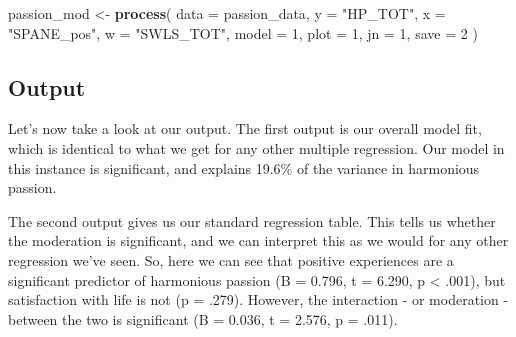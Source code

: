 \documentclass[
]{book}
\newenvironment{Shaded}{\begin{snugshade}}{\end{snugshade}}
\newcommand{\AttributeTok}[1]{\textcolor[rgb]{0.13,0.29,0.53}{#1}}
\newcommand{\DecValTok}[1]{\textcolor[rgb]{0.00,0.00,0.81}{#1}}
\newcommand{\FunctionTok}[1]{\textcolor[rgb]{0.13,0.29,0.53}{\textbf{#1}}}
\newcommand{\NormalTok}[1]{#1}
\newcommand{\OtherTok}[1]{\textcolor[rgb]{0.56,0.35,0.01}{#1}}
\newcommand{\StringTok}[1]{\textcolor[rgb]{0.31,0.60,0.02}{#1}}
\begin{document}
\begin{Shaded}
\begin{Highlighting}[]
\NormalTok{passion\_mod }\OtherTok{\textless{}{-}} \FunctionTok{process}\NormalTok{(}
  \AttributeTok{data =}\NormalTok{ passion\_data,}
  \AttributeTok{y =} \StringTok{"HP\_TOT"}\NormalTok{,}
  \AttributeTok{x =} \StringTok{"SPANE\_pos"}\NormalTok{,}
  \AttributeTok{w =} \StringTok{"SWLS\_TOT"}\NormalTok{,}
  \AttributeTok{model =} \DecValTok{1}\NormalTok{,}
  \AttributeTok{plot =} \DecValTok{1}\NormalTok{,}
  \AttributeTok{jn =} \DecValTok{1}\NormalTok{,}
  \AttributeTok{save =} \DecValTok{2}
\NormalTok{)}
\end{Highlighting}
\end{Shaded}

\subsection{Output}\label{output-10}

Let's now take a look at our output. The first output is our overall model fit, which is identical to what we get for any other multiple regression. Our model in this instance is significant, and explains 19.6\% of the variance in harmonious passion.

The second output gives us our standard regression table. This tells us whether the moderation is significant, and we can interpret this as we would for any other regression we've seen. So, here we can see that positive experiences are a significant predictor of harmonious passion (B = 0.796, t = 6.290, p \textless{} .001), but satisfaction with life is not (p = .279). However, the interaction - or moderation - between the two is significant (B = 0.036, t = 2.576, p = .011).
\end{document}
